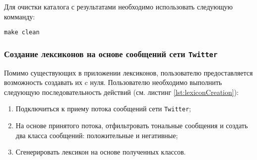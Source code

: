         Для очистки каталога с результатами необходимо использовать следующую
        комманду:
        \begin{center}
            {\tt make clean}
        \end{center}

        \subsubsection{Создание лексиконов на основе сообщений сети
            {\tt Twitter} }
        Помимо существующих в приложении лексиконов, пользователю предоставляется
        возможность создавать их c нуля. Пользователю необходимо выполнить следующую
        последовательность действий (см. листинг \ref{lst:lexiconCreation}):
        \begin{enumerate}
            \item Подключиться к приему потока сообщений сети {\tt Twitter};
            \item На основе принятого потока, отфильтровать тональные сообщения
            и создать два класса сообщений: положительные и негативные;
            \item Сгенерировать лексикон на основе полученных классов.
        \end{enumerate}

        \lstset{style=bash}
        
